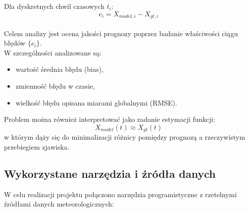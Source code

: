\documentclass[a4paper,12pt]{article}
\begin{document}
\noindent
Dla dyskretnych chwil czasowych $t_i$:
\[
e_i = X_{model,i} - X_{gt,i}
\]
\\

\noindent
Celem analizy jest ocena jakości prognozy poprzez badanie właściwości ciągu błędów $\{e_i\}$.
\\

\noindent
W szczególności analizowane są:
\begin{itemize}
    \item wartość średnia błędu (bias),
    \item zmienność błędu w czasie,
    \item wielkość błędu opisana miarami globalnymi (RMSE).
\end{itemize}
\noindent
Problem można również interpretować jako zadanie estymacji funkcji:
\[
X_{model}(t) \approx X_{gt}(t)
\]
w którym dąży się do minimalizacji różnicy pomiędzy prognozą a rzeczywistym przebiegiem zjawiska.
\newpage
\subsection{Wykorzystane narzędzia i źródła danych}

W celu realizacji projektu połączono narzędzia programistyczne z rzetelnymi źródłami danych meteorologicznych:
\end{document}
